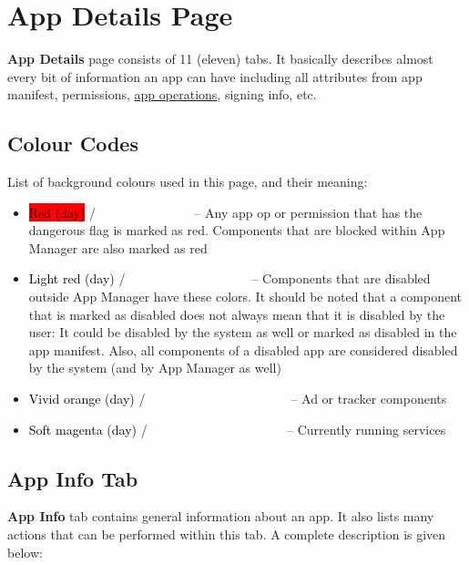 \section{App Details Page}\label{sec:app-details-page}
\textbf{App Details} page consists of 11 (eleven) tabs. It basically describes almost every bit of information an app
can have including all attributes from app manifest, permissions, \hyperref[ch:app-ops]{app operations}, signing info,
etc.

\subsection{Colour Codes}\label{subsec:app-details-colour-codes}
List of background colours used in this page, and their meaning:
\begin{itemize}
    \item \colorbox{red}{\textcolor{black}{Red (day)}} / \colorbox{AMDarkRed}{\textcolor{white}{dark red (night)}}
    -- Any app op or permission that has the dangerous flag is marked as red. Components that are blocked within App
    Manager are also marked as red

    \item \colorbox{AMLightRed}{\textcolor{black}{Light red (day)}} / \colorbox{AMVeryDarkRed}{\textcolor{white}{very
    dark red (night)}} -- Components that are disabled outside App Manager have these colors. It should be noted that a
    component that is marked as disabled does not always mean that it is disabled by the user: It could be disabled by
    the system as well or marked as disabled in the app manifest. Also, all components of a disabled app are considered
    disabled by the system (and by App Manager as well)

    \item \colorbox{AMVividOrange}{\textcolor{black}{Vivid orange (day)}} / \colorbox{AMVeryDarkOrange}{
        \textcolor{white}{very dark orange (night)}} -- Ad or tracker components

    \item \colorbox{AMSoftMagenta}{\textcolor{black}{Soft magenta (day)}} / \colorbox{AMVeryDarkViolet}{
        \textcolor{white}{very dark violet (night)}} -- Currently running services
\end{itemize}

\subsection{App Info Tab}\label{subsec:app-info-tab}
\textbf{App Info} tab contains general information about an app. It also lists many actions that can be performed within
this tab. A complete description is given below:

